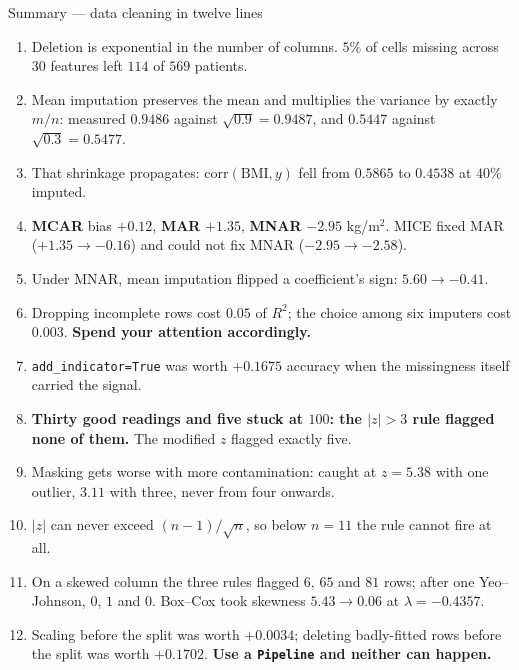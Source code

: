 \documentclass[aspectratio=169]{beamer}
\begin{document}
\begin{frame}[shrink=14]{Summary --- data cleaning in twelve lines}
  \begin{enumerate}\small
    \item Deletion is exponential in the number of columns. $5\%$ of cells
      missing across $30$ features left $114$ of $569$ patients.
    \item Mean imputation preserves the mean and multiplies the variance by
      exactly $m/n$: measured $0.9486$ against $\sqrt{0.9}=0.9487$, and
      $0.5447$ against $\sqrt{0.3}=0.5477$.
    \item That shrinkage propagates: $\mathrm{corr}(\text{BMI},y)$ fell from
      $0.5865$ to $0.4538$ at $40\%$ imputed.
    \item \textbf{MCAR} bias $+0.12$, \textbf{MAR} $+1.35$, \textbf{MNAR}
      $-2.95$ kg/m$^2$. MICE fixed MAR ($+1.35 \to -0.16$) and could not fix
      MNAR ($-2.95 \to -2.58$).
    \item Under MNAR, mean imputation flipped a coefficient's sign:
      $5.60 \to -0.41$.
    \item Dropping incomplete rows cost $0.05$ of $R^2$; the choice among six
      imputers cost $0.003$. \textbf{Spend your attention accordingly.}
    \item \texttt{add\_indicator=True} was worth $+0.1675$ accuracy when the
      missingness itself carried the signal.
    \item \textbf{Thirty good readings and five stuck at $100$: the $|z|>3$
      rule flagged none of them.} The modified $z$ flagged exactly five.
    \item Masking gets worse with more contamination: caught at $z=5.38$ with
      one outlier, $3.11$ with three, never from four onwards.
    \item $|z|$ can never exceed $(n-1)/\sqrt n$, so below $n=11$ the rule
      cannot fire at all.
    \item On a skewed column the three rules flagged $6$, $65$ and $81$ rows;
      after one Yeo--Johnson, $0$, $1$ and $0$. Box--Cox took skewness
      $5.43 \to 0.06$ at $\lambda = -0.4357$.
    \item Scaling before the split was worth $+0.0034$; deleting badly-fitted
      rows before the split was worth $+0.1702$. \textbf{Use a
      \texttt{Pipeline} and neither can happen.}
  \end{enumerate}
\end{frame}
\end{document}
